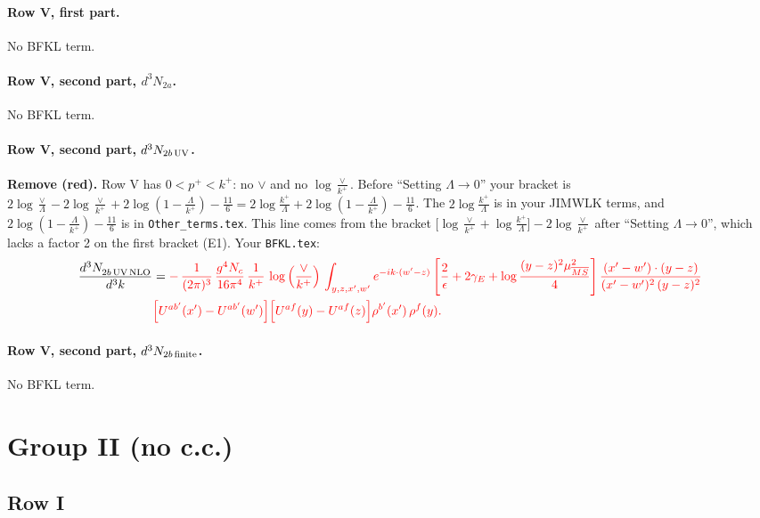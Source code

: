 \documentclass[10pt]{article}
\numberwithin{equation}{section}
\newcommand{\old}[1]{{\color{red}#1}}
\newcommand{\rc}{\color{red}}
\begin{document}
\paragraph{Row V, first part.}
No BFKL term.
\paragraph{Row V, second part, $d^3N_{2a}$.}
No BFKL term.
\paragraph{Row V, second part, $d^3N_{2b\,\rm UV}$.}
\textbf{Remove (\old{red}).} Row V has $0<p^+<k^+$: no $\vee$ and no $\log\frac{\vee}{k^+}$. Before ``Setting $\Lambda\to0$'' your bracket is $2\log\frac{\vee}{\Lambda}-2\log\frac{\vee}{k^+}+2\log(1-\frac{\Lambda}{k^+})-\frac{11}{6}=2\log\frac{k^+}{\Lambda}+2\log(1-\frac{\Lambda}{k^+})-\frac{11}{6}$. The $2\log\frac{k^+}{\Lambda}$ is in your JIMWLK terms, and $2\log(1-\frac{\Lambda}{k^+})-\frac{11}{6}$ is in \texttt{Other\_terms.tex}. This line comes from the bracket $\big[\log\frac{\vee}{k^+}+\log\frac{k^+}{\Lambda}\big]-2\log\frac{\vee}{k^+}$ after ``Setting $\Lambda\to0$'', which lacks a factor 2 on the first bracket (E1).
\noindent Your \texttt{BFKL.tex}:
\begin{align}
\frac{d^{3}N_{2b\,\rm UV\, NLO}^{\rm}}{d^{3}k} & =  \rc -\,\frac{1}{(2\pi)^{3}}\,\frac{g^{4}N_{c}}{16\pi^{4}}\,\frac{1}{k^{+}}
\, \log{\left(\frac{\vee}{k^{+}}\right)}\,\int_{y,z,x',w'}e^{-ik\cdot(w'-z)}\left[\frac{2}{\epsilon}+2\gamma_{E}+\log\frac{(y-z)^{2}\mu^{2}_{\overline{MS}}}{4}\right]
\frac{(x'-w')\cdot(y-z)}{(x'-w')^{2}\,(y-z)^{2}}\notag \\ & \rc   \Big[U^{ab'}(x')-U^{ab'}(w')\Big]\Big[U^{af}(y)-U^{af}(z)\Big]\rho^{b'}(x')\,\rho^{f}(y). \label{eq:Byour:G1V2bUV}
\end{align}

\paragraph{Row V, second part, $d^3N_{2b\,\rm finite}$.}
No BFKL term.
\section{Group II (no c.c.)}\label{sec:BgII}
\subsection{Row I}
\end{document}
